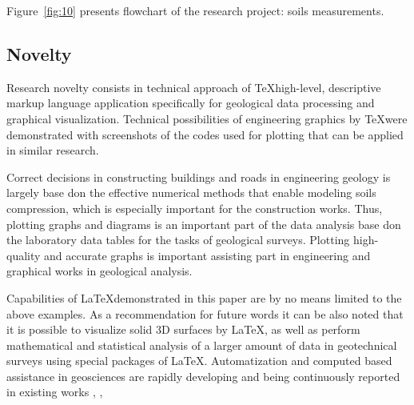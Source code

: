 \documentclass[a4paper,10pt]{article}
\begin{document}
Figure~\ref{fig:10} presents flowchart of the research project: soils measurements.

\subsection{Novelty}
Research novelty consists in technical approach of \TeX \space high-level, descriptive markup language application specifically for geological data processing and graphical visualization. Technical possibilities of engineering graphics by \TeX \space were demonstrated with screenshots of the codes used for plotting that can be applied in similar research. 

Correct decisions in constructing buildings and roads in engineering geology is largely base don the effective numerical methods that enable modeling soils compression, which is especially important for the construction works. Thus, plotting graphs and diagrams is an important part of the data analysis base don the laboratory data tables for the tasks of geological surveys. Plotting high-quality and accurate graphs is important assisting part in engineering and graphical works in geological analysis. 

Capabilities of \LaTeX \space demonstrated in this paper are by no means limited to the above examples. As a recommendation for future words it can be also noted that it is possible to visualize solid 3D surfaces by \LaTeX, as well as perform mathematical and statistical analysis of a larger amount of data in geotechnical surveys using special packages of \LaTeX. 
Automatization and computed based assistance in geosciences are rapidly developing and being continuously reported in existing works \cite{Schenke}, \cite{Lemenkova201995}, \cite{Lemenkova201994}





\end{document}
